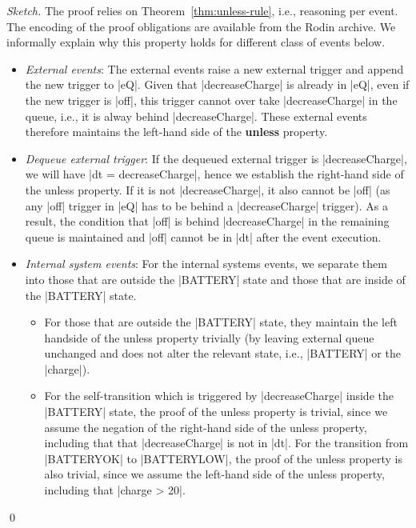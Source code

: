 \begin{proof}[Sketch]
 The proof relies on Theorem~\ref{thm:unless-rule}, i.e.,
 reasoning per event.  The encoding of the proof obligations are
 available from the Rodin archive. We informally explain why this
 property holds for different class of events below.
 \begin{itemize}
 \item \emph{External events}: The external events raise a new external
   trigger and append the new trigger to |eQ|. Given that
   |decreaseCharge| is already in |eQ|, even if the new trigger is
   |off|, this trigger cannot over take |decreaseCharge| in the queue,
   i.e., it is alway behind |decreaseCharge|. These external events
   therefore maintains the left-hand side of the \textbf{unless} property.
   
 \item \emph{Dequeue external trigger}: If the dequeued external
   trigger is |decreaseCharge|, we will have |dt = {decreaseCharge}|,
   hence we establish the right-hand side of the unless property.
   If it is not |decreaseCharge|, it also cannot be |off| (as any
   |off| trigger in |eQ| has to be behind a |decreaseCharge|
   trigger). As a result, the condition that |off| is behind
   |decreaseCharge| in the remaining queue is maintained and
   |off| cannot be in |dt| after the event execution.
   
 \item \emph{Internal system events}: For the internal systems events,
   we separate them into those that are outside the |BATTERY| state
   and those that are inside of the |BATTERY| state.
   \begin{itemize}
   \item For those that are outside the |BATTERY| state, they maintain
     the left handside of the unless property trivially (by leaving
     external queue unchanged and does not alter the relevant state,
     i.e., |BATTERY| or the |charge|).
     
   \item For the self-transition which is triggered by
     |decreaseCharge| inside the |BATTERY| state, the proof of the
     unless property is trivial, since we assume the negation of the
     right-hand side of the unless property, including that that
     |decreaseCharge| is not in |dt|. For the transition from
     |BATTERYOK| to |BATTERYLOW|, the proof of the unless property is
     also trivial, since we assume the left-hand side of the unless
     property, including that |charge > 20|.
   \end{itemize}
 \end{itemize}
 \qed
\end{proof}

